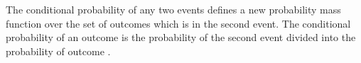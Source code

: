 

The conditional probability
of any two events
defines a new probability
mass function over the
set of outcomes
which is in the second
event.
The conditional probability
of an outcome
is the probability of the
second event
divided into the probability
of outcome .
